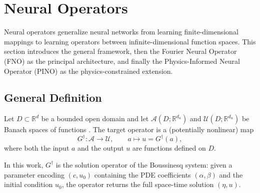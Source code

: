 \section{Neural Operators}
\label{sec:neural_operators}

Neural operators generalize neural networks from learning finite-dimensional mappings to learning operators between infinite-dimensional function spaces. This section introduces the general framework, then the Fourier Neural Operator (FNO) as the principal architecture, and finally the Physics-Informed Neural Operator (PINO) as the physics-constrained extension.

\subsection{General Definition}
\label{subsec:no_general}

Let $D \subset \mathbb{R}^{d}$ be a bounded open domain and let $\mathcal{A}(D; \mathbb{R}^{d_a})$ and $\mathcal{U}(D; \mathbb{R}^{d_u})$ be Banach spaces of functions \parencite{kreyszig1978introductory}. The target operator is a (potentially nonlinear) map
\begin{equation}
    G^\dagger : \mathcal{A} \to \mathcal{U},
    \qquad a \mapsto u = G^\dagger(a),
\end{equation}
where both the input $a$ and the output $u$ are functions defined on $D$.

In this work, $G^\dagger$ is the solution operator of the Boussinesq system: given a parameter encoding $(c, u_0)$ containing the PDE coefficients $(\alpha, \beta)$ and the initial condition $u_0$, the operator returns the full space-time solution $(\eta, u)$.

